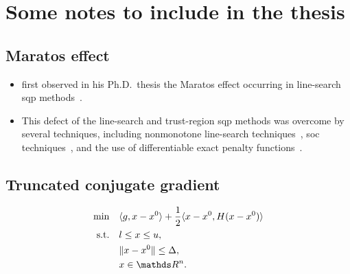 %
%
%
\chapter{Some notes to include in the thesis}

%
%
%

\section{Maratos effect}

\begin{itemize}
    \item \citeauthor{Maratos_1978} first observed in his Ph.D.\ thesis the Maratos effect occurring in line-search \gls{sqp} methods~\cite{Maratos_1978}.
    \item This defect of the line-search and trust-region \gls{sqp} methods was overcome by several techniques, including nonmonotone line-search techniques~\cite{Chamberlain_Etal_1982}, \gls{soc} techniques~\cite{Colman_Conn_1982a,Colman_Conn_1982b,Fletcher_1982,Fukushima_1986,Mayne_1980,Mayne_Polak_1982}, and the use of differentiable exact penalty functions~\cite{Powell_Yuan_1990}.
\end{itemize}

\section{Truncated conjugate gradient}

\begin{subequations}
    \label{eq:tcg}
    \begin{align}
        \min        & \quad \inner{g, x - x^0} + \frac{1}{2} \inner{x - x^0, H(x - x^0)} \label{eq:tcg-obj}\\
        \text{s.t.} & \quad \xl \le x \le \xu, \label{eq:tcg-bd}\\
                    & \quad \norm{x - x^0} \le \Delta, \label{eq:tcg-tr}\\
                    & \quad x \in \R^n. \nonumber
    \end{align}
\end{subequations}

